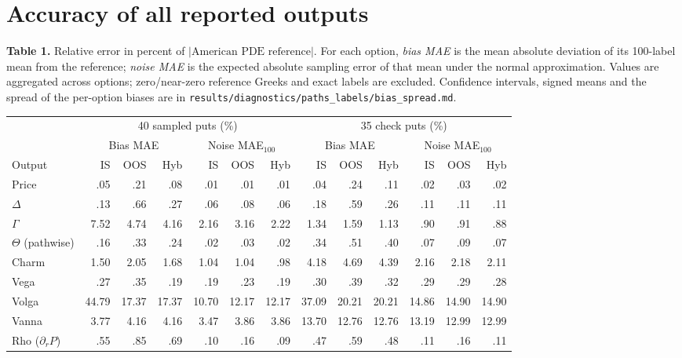 \documentclass[10pt,letterpaper]{article}
\renewcommand{\arraystretch}{1.10}
\begin{document}
\section*{Accuracy of all reported outputs}
\textbf{Table 1.} Relative error in percent of $|\text{American PDE reference}|$.
For each option, \emph{bias MAE} is the mean absolute deviation of its
100-label mean from the reference; \emph{noise MAE} is the expected absolute
sampling error of that mean under the normal approximation. Values are aggregated across
options; zero/near-zero reference Greeks and exact labels are excluded. Confidence intervals,
signed means and the spread of the per-option biases are in
\texttt{results/diagnostics/paths\_labels/bias\_spread.md}.
\begin{center}
\fontsize{7.9}{9.2}\selectfont
\setlength{\tabcolsep}{3.4pt}\renewcommand{\arraystretch}{1.12}
\begin{tabular}{@{}lrrrrrrrrrrrr@{}}
\toprule
 & \multicolumn{6}{c}{40 sampled puts (\%)} & \multicolumn{6}{c}{35 check puts (\%)}\\
\cmidrule(lr){2-7}\cmidrule(l){8-13}
 & \multicolumn{3}{c}{Bias MAE} & \multicolumn{3}{c}{Noise MAE$_{100}$} & \multicolumn{3}{c}{Bias MAE} & \multicolumn{3}{c}{Noise MAE$_{100}$}\\
\cmidrule(lr){2-4}\cmidrule(lr){5-7}\cmidrule(lr){8-10}\cmidrule(l){11-13}
Output & IS & OOS & Hyb & IS & OOS & Hyb & IS & OOS & Hyb & IS & OOS & Hyb\\
\midrule
Price & .05 & .21 & .08 & .01 & .01 & .01 & .04 & .24 & .11 & .02 & .03 & .02 \\
$\Delta$ & .13 & .66 & .27 & .06 & .08 & .06 & .18 & .59 & .26 & .11 & .11 & .11 \\
$\Gamma$ & 7.52 & 4.74 & 4.16 & 2.16 & 3.16 & 2.22 & 1.34 & 1.59 & 1.13 & .90 & .91 & .88 \\
$\Theta$ (pathwise) & .16 & .33 & .24 & .02 & .03 & .02 & .34 & .51 & .40 & .07 & .09 & .07 \\
Charm & 1.50 & 2.05 & 1.68 & 1.04 & 1.04 & .98 & 4.18 & 4.69 & 4.39 & 2.16 & 2.18 & 2.11 \\
Vega & .27 & .35 & .19 & .19 & .23 & .19 & .30 & .39 & .32 & .29 & .29 & .28 \\
Volga & 44.79 & 17.37 & 17.37 & 10.70 & 12.17 & 12.17 & 37.09 & 20.21 & 20.21 & 14.86 & 14.90 & 14.90 \\
Vanna & 3.77 & 4.16 & 4.16 & 3.47 & 3.86 & 3.86 & 13.70 & 12.76 & 12.76 & 13.19 & 12.99 & 12.99 \\
Rho ($\partial_rP$) & .55 & .85 & .69 & .10 & .16 & .09 & .47 & .59 & .48 & .11 & .16 & .11 \\

\end{tabular}
\end{center}
\end{document}
